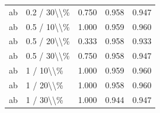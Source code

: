 \begin{table}[!h]
\begin{tabular}[t]{llccc}
\addlinespace
ab & 0.2 / 30\textbackslash{}\textbackslash{}\% & 0.750 & 0.958 & 0.947\\
ab & 0.5 / 10\textbackslash{}\textbackslash{}\% & 1.000 & 0.959 & 0.960\\
ab & 0.5 / 20\textbackslash{}\textbackslash{}\% & 0.333 & 0.958 & 0.933\\
ab & 0.5 / 30\textbackslash{}\textbackslash{}\% & 0.750 & 0.958 & 0.947\\
ab & 1 / 10\textbackslash{}\textbackslash{}\% & 1.000 & 0.959 & 0.960\\
\addlinespace
ab & 1 / 20\textbackslash{}\textbackslash{}\% & 1.000 & 0.958 & 0.960\\
ab & 1 / 30\textbackslash{}\textbackslash{}\% & 1.000 & 0.944 & 0.947\\
\bottomrule
\end{tabular}
\end{table}
